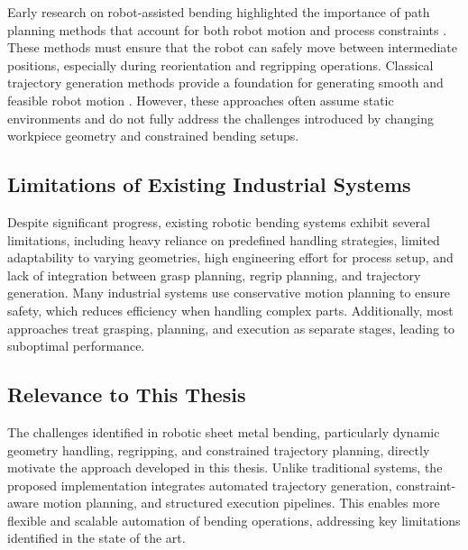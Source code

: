 Early research on robot-assisted bending highlighted the importance of path planning methods that account for both robot motion and process constraints \cite{Bogue2018}. These methods must ensure that the robot can safely move between intermediate positions, especially during reorientation and regripping operations.
Classical trajectory generation methods provide a foundation for generating smooth and feasible robot motion \cite{Biagiotti2008Trajectory}. However, these approaches often assume static environments and do not fully address the challenges introduced by changing workpiece geometry and constrained bending setups.

\subsection{Limitations of Existing Industrial Systems}
Despite significant progress, existing robotic bending systems exhibit several limitations, including heavy reliance on predefined handling strategies, limited adaptability to varying geometries, high engineering effort for process setup, and lack of integration between grasp planning, regrip planning, and trajectory generation.
Many industrial systems use conservative motion planning to ensure safety, which reduces efficiency when handling complex parts. Additionally, most approaches treat grasping, planning, and execution as separate stages, leading to suboptimal performance.
\subsection{Relevance to This Thesis}
The challenges identified in robotic sheet metal bending, particularly dynamic geometry handling, regripping, and constrained trajectory planning, directly motivate the approach developed in this thesis.
Unlike traditional systems, the proposed implementation integrates automated trajectory generation, constraint-aware motion planning, and structured execution pipelines.
This enables more flexible and scalable automation of bending operations, addressing key limitations identified in the state of the art.


